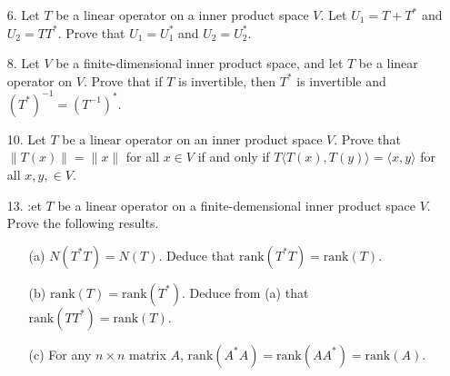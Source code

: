 \begin{enumerate}
    \item[6.] Let \(T\) be a linear operator on a inner product space \(V\). Let \(U_1 = T + T^*\) and \(U_2 = TT^*\). Prove that \( U_1 = U_1^*\) and \(U_2 = U_2^*\). \vspace{3cm}
    \item[8.] Let \(V\) be a finite-dimensional inner product space, and let \(T\) be a linear operator on \(V\). Prove that if \(T\) is invertible, then \(T^*\) is invertible and \((T^*)^{-1} = (T^{-1})^*\). \vspace{3cm}
    \item[10.] Let \(T\) be a linear operator on an inner product space \(V\). Prove that \(\lVert T(x) \rVert = \lVert x \rVert\) for all \(x \in V\) if and only if \(T\langle T(x), T(y)\rangle = \langle x ,y\rangle\) for all \(x,y,\in V\). \vspace{3cm}
    \item[13.] :et \(T\) be a linear operator on a finite-demensional inner product space \(V\). Prove the following results.
    \begin{enumerate}
        \item[(a)] \(N(T^*T) = N(T)\). Deduce that \(\text{rank}(T^*T) = \text{rank}(T)\).
        \item[(b)] \(\text{rank}(T) = \text{rank}(T^*)\). Deduce from (a) that \(\text{rank}(TT^*) = \text{rank}(T)\).
        \item[(c)] For any \(n\times n\) matrix \(A\), \(\text{rank}(A^*A) = \text{rank}(AA^*) = \text{rank}(A)\).
    \end{enumerate}
\end{enumerate}
\newpage
